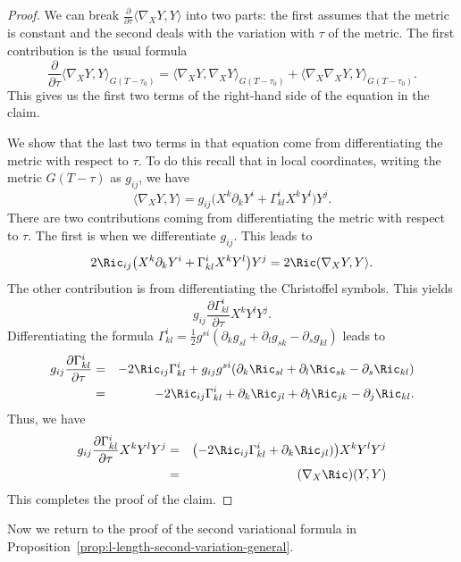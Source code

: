 \begin{proof}
We can break $\frac{\partial}{\partial\tau}\langle \nabla_{X}Y,Y\rangle $ into
two parts: the first  assumes that the metric is constant and the second deals
with the variation with $\tau$ of the metric. The first contribution is the
usual formula
$$\frac{\partial}{\partial\tau}\langle \nabla_{X}Y,Y\rangle _{G(T-\tau_0)}=
\langle \nabla_{X}Y,\nabla_{X}Y\rangle _{G(T-\tau_0)}+ \langle
\nabla_{X}\nabla_{X}Y,Y\rangle _{G(T-\tau_0)}.$$ This gives us the first two
terms of the right-hand side of the equation in the claim.

We show that the last two terms in that equation come from differentiating the
metric with respect to $\tau$. To do this recall that in local coordinates,
writing the metric $G(T-\tau)$ as $g_{ij}$, we have
$$\langle \nabla_{X}Y,Y \rangle=g_{ij}\bigl(X^k\partial_k
Y^i+\Gamma_{kl}^iX^kY^l\bigr)Y^j.$$ There are two contributions coming from
differentiating the metric with respect to $\tau$. The first is when we
differentiate $g_{ij}$. This leads to
$$2\Ric_{ij}\bigl(X^k\partial_k
Y^i+\Gamma_{kl}^iX^kY^l\bigr)Y^j=2\Ric(\nabla_XY,Y\rangle.$$
The other contribution is from differentiating the Christoffel
symbols. This yields
$$g_{ij}\frac{\partial\Gamma^{i}_{kl}}{\partial \tau}X^{k}Y^{l}Y^{j}.$$
Differentiating the formula
$\Gamma_{kl}^i=\frac{1}{2}g^{si}(\partial_kg_{sl}+\partial_lg_{sk}-\partial_s
g_{kl})$ leads to \begin{eqnarray*} g_{ij}\frac{\partial
\Gamma_{kl}^i}{\partial \tau} & = & -2\Ric_{ij}\Gamma_{kl}^i+g_{ij}g^{si}(\partial_k\Ric_{sl}+\partial_l\Ric_{sk}
-\partial_s\Ric_{kl})\\
& = & -2\Ric_{ij}\Gamma_{kl}^i+
\partial_k\Ric_{jl}+\partial_l\Ric_{jk} -\partial_j\Ric_{kl}.
\end{eqnarray*}
Thus, we have
\begin{eqnarray*}
g_{ij}\frac{\partial\Gamma^{i}_{kl}}{\partial \tau}X^{k}Y^{l}Y^{j}
 & = & \bigl(-2\Ric_{ij}\Gamma^i_{kl}+\partial_k\Ric_{jl})\bigr)X^kY^lY^j \\
& = & (\nabla_X\Ric)(Y,Y)
\end{eqnarray*}
This completes the proof of the claim.
\end{proof}








Now we return to the proof of the second variational formula in
Proposition~\ref{prop:l-length-second-variation-general}.



